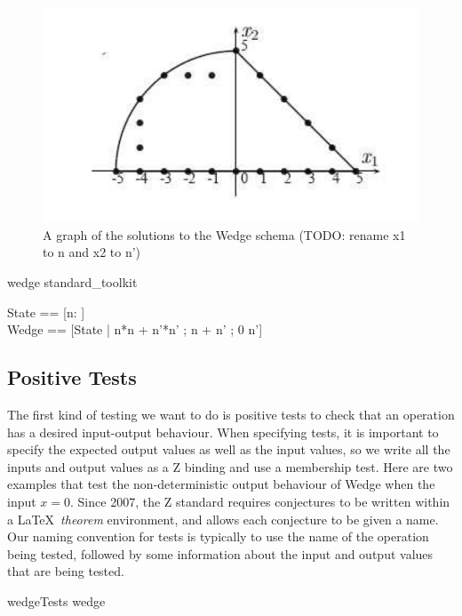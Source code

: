 \documentclass{llncs}
\begin{document}
\begin{figure}[htbp]
  \centering
  \includegraphics{wedge}
  \caption{A graph of the solutions to the Wedge schema (TODO: rename x1 to n and x2 to n')}
  \label{fig:wedge}
\end{figure}

\begin{zsection}
  \SECTION wedge \parents standard\_toolkit
\end{zsection}
\begin{zed}
  State == [n:  ] \\
  Wedge == [\Delta State | n*n + n'*n' ; n + n' ; 0 \leq n']
\end{zed}

\subsection{Positive Tests}

The first kind of testing we want to do is positive tests to check that an
operation has a desired input-output behaviour.  When specifying
tests, it is important to specify the expected output values as well as the
input values, so we write all the inputs and output values as a Z binding
and use a membership test.  Here are two examples that test the
non-deterministic output behaviour of Wedge when the input $x=0$.
Since 2007, the Z standard requires conjectures to be written within
a \LaTeX\ \emph{theorem} environment, and allows each conjecture to be
given a name.  Our naming convention for tests is typically to use the name
of the operation being tested, followed by some information about the input
and output values that are being tested.

\begin{zsection}
  \SECTION wedgeTests \parents wedge
\end{zsection}
\end{document}
